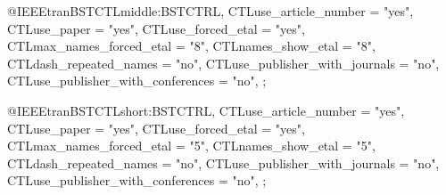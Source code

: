 %




@IEEEtranBSTCTL{middle:BSTCTRL,
	CTLuse_article_number = "yes",
    CTLuse_paper = "yes",
	CTLuse_forced_etal = "yes",
	CTLmax_names_forced_etal = "8",
	CTLnames_show_etal = "8",
	CTLdash_repeated_names = "no",
    CTLuse_publisher_with_journals = "no",
    CTLuse_publisher_with_conferences = "no",
};

@IEEEtranBSTCTL{short:BSTCTRL,
	CTLuse_article_number = "yes",
	CTLuse_paper = "yes",
	CTLuse_forced_etal = "yes",
	CTLmax_names_forced_etal = "5",
	CTLnames_show_etal = "5",
	CTLdash_repeated_names = "no",
    CTLuse_publisher_with_journals = "no",
    CTLuse_publisher_with_conferences = "no",
};


%
%



